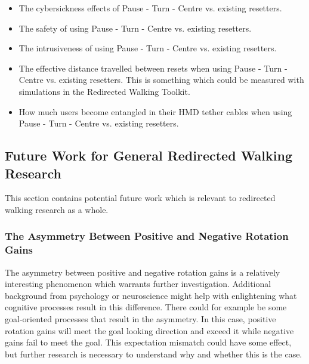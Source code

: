 \begin{itemize}
    \item The cybersickness effects of Pause - Turn - Centre vs. existing resetters.
    \item The safety of using Pause - Turn - Centre vs. existing resetters.
    \item The intrusiveness of using Pause - Turn - Centre vs. existing resetters.
    \item The effective distance travelled between resets when using Pause - Turn - Centre vs. existing resetters. This is something which could be measured with simulations in the Redirected Walking Toolkit. 
    \item How much users become entangled in their HMD tether cables when using Pause - Turn - Centre vs. existing resetters.
\end{itemize}

\subsection{Future Work for General Redirected Walking Research}
This section contains potential future work which is relevant to redirected walking research as a whole.

\subsubsection{The Asymmetry Between Positive and Negative Rotation Gains}
The asymmetry between positive and negative rotation gains is a relatively interesting phenomenon which warrants further investigation. Additional background from psychology or neuroscience might help with enlightening what cognitive processes result in this difference. There could for example be some goal-oriented processes that result in the asymmetry. In this case, positive rotation gains will meet the goal looking direction and exceed it while negative gains fail to meet the goal. This expectation mismatch could have some effect, but further research is necessary to understand why and whether this is the case. 
      
